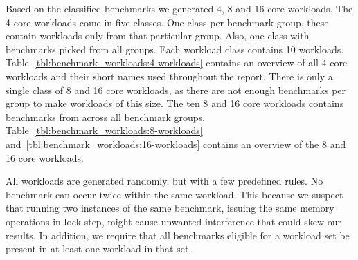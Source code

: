



Based on the classified benchmarks we generated 4, 8 and 16 core workloads.
The 4 core workloads come in five classes.
One class per benchmark group, these contain workloads only from that particular group.
Also, one class with benchmarks picked from all groups.
Each workload class contains 10 workloads.
Table~\ref{tbl:benchmark_workloads:4-workloads} contains an overview of all 4 core workloads and their short names used throughout the report.
There is only a single class of 8 and 16 core workloads, as there are not enough benchmarks per group to make workloads of this size. 
The ten 8 and 16 core workloads contains benchmarks from across all benchmark groups.
Table~\ref{tbl:benchmark_workloads:8-workloads} and~\ref{tbl:benchmark_workloads:16-workloads} contains an overview of the 8 and 16 core workloads.

All workloads are generated randomly, but with a few predefined rules.
No benchmark can occur twice within the same workload.
This because we suspect that running two instances of the same benchmark, issuing the same memory operations in lock step, might cause unwanted interference that could skew our results. 
In addition, we require that all benchmarks eligible for a workload set be present in at least one workload in that set.